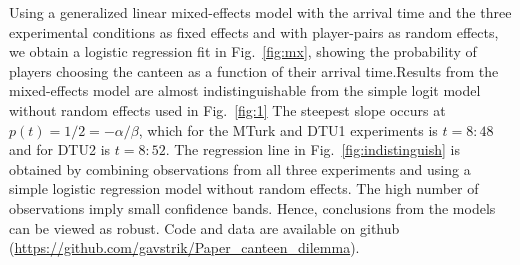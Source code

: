 Using a generalized linear mixed-effects model with the arrival time and the three experimental conditions as fixed effects and with player-pairs as random effects, we obtain a logistic regression fit in Fig.~\ref{fig:mx}, showing the probability of players choosing the canteen as a function of their arrival time.Results from the mixed-effects  model are almost indistinguishable from the simple logit model without random effects used in Fig.~\ref{fig:1} The steepest slope occurs at $p(t) = 1/2 = -\alpha/\beta$, which for the MTurk and DTU1 experiments is $t=8{:}48$ and for DTU2 is $t=8{:}52$. The regression line in Fig.~\ref{fig:indistinguish} is obtained by combining observations from all three experiments and using a simple logistic regression model without random effects. The high number of observations imply small confidence bands. Hence, conclusions from the models can be viewed as robust. Code and data are available on github (\url{https://github.com/gavstrik/Paper_canteen_dilemma}).


